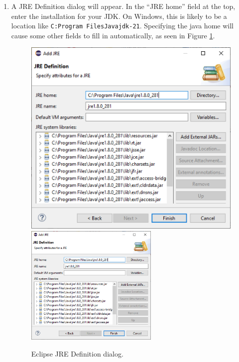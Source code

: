 \begin{enumerate}
\item A {\sf JRE Definition} dialog will appear. In the ``{\sf JRE home}''
field at the top, enter the installation \directory{} for your JDK.
\ifWindows %
On Windows, this is likely to be a location like {\tt C:\BKS Program
Files\BKS Java\BKS jdk-21}. Specifying the java
home \directory{} will cause some other fields to fill in
automatically, as seen in Figure \ref{JREDefinition:fig}.
%
\begin{figure}[ht]
\begin{center}
\iflatexml
   \includegraphics[]{images/EclipseJREDefinition}
\else
   \includegraphics[width=0.6\textwidth]{images/EclipseJREDefinition}
\fi
\end{center}
\caption{Eclipse JRE Definition dialog.}
\label{JREDefinition:fig}
\end{figure}
\fi %


\end{enumerate}
